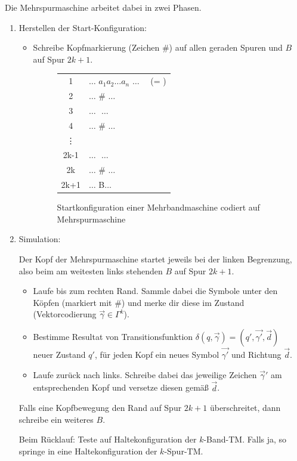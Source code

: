 \begin{Bemerkung}
	Die Mehrspurmaschine arbeitet dabei in zwei Phasen.
	\begin{enumerate}
		\item Herstellen der Start-Konfiguration:
		
		\begin{itemize}
			\item Schreibe Kopfmarkierung (Zeichen \#) auf allen geraden Spuren und $B$ auf Spur $2k+1$.
			\begin{figure}[H]\centering
				\begin{tabular}{cl}
					\text{Spur }1 & $\ldots$ \blank $a_1a_2\dots a_n$ \blank $\ldots$ ~~(= \text{Eingabe})\\
					2 & $\ldots$ \blank \#\! \blank $\ldots$\\
					3 & $\ldots$ \blank\,\blank\,\blank $\ldots$\\
					4 & $\ldots$ \blank \#\! \blank $\ldots$\\
					\vdots\\
					2k-1 & $\ldots$ \blank\,\blank\,\blank $\ldots$\\
					2k & $\ldots$ \blank \#\! \blank $\ldots$\\
					2k+1 & $\ldots$ \blank B\blank $\ldots$
				\end{tabular}
				\caption{Startkonfiguration einer Mehrbandmaschine codiert auf Mehrspurmaschine}
			\end{figure}
		\end{itemize}
		
		\item Simulation:
		
		Der Kopf der Mehrspurmaschine startet jeweils bei der linken Begrenzung, also beim am weitesten links stehenden $B$ auf Spur $2k+1$.
		\begin{itemize}
			\item Laufe bis zum rechten Rand.
			Sammle dabei die Symbole unter den Köpfen (markiert mit \#) und merke dir diese im Zustand (Vektorcodierung $\overrightarrow{\gamma} \in \Gamma^k$).
			\item Bestimme Resultat von Transitionsfunktion $\delta(q,\overrightarrow{\gamma})=(q',\overrightarrow{\gamma'},\overrightarrow{d})$\\
			neuer Zustand $q'$, für jeden Kopf ein neues Symbol $\overrightarrow{\gamma'}$ und Richtung $\overrightarrow{d}$.
			\item Laufe zurück nach links.
			Schreibe dabei das jeweilige Zeichen $\overrightarrow{\gamma}'$ am entsprechenden Kopf und versetze diesen gemäß $\overrightarrow{d}$.
		\end{itemize}
		Falls eine Kopfbewegung den Rand auf Spur $2k+1$ überschreitet, dann schreibe ein weiteres $B$.
		
		Beim Rücklauf: Teste auf Haltekonfiguration der $k$-Band-\ac{TM}.
		Falls ja, so springe in eine Haltekonfiguration der $k$-Spur-\ac{TM}.
		\qedhere
	\end{enumerate}
\end{Bemerkung}


